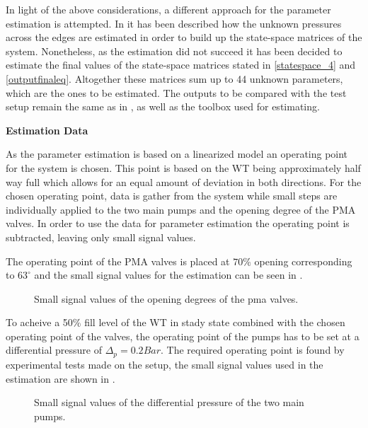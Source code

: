 In light of the above considerations, a different approach for the parameter estimation is attempted. In  it has been described how the 
unknown pressures across the edges are estimated in order to build up the state-space matrices of the system. Nonetheless, as the estimation did not 
succeed it has been decided to estimate the final values of the state-space matrices stated in \eqref{statespace_4} and \eqref{outputfinaleq}. 
Altogether these matrices sum up to 44 unknown parameters, which are the ones to be estimated. The outputs to be compared with the test setup remain 
the same as in , as well as the toolbox used for estimating.

\textbf{Estimation Data}

As the parameter estimation is based on a linearized model an operating point for the system is chosen. This point is based on the WT being approximately half way full which allows for an equal amount of deviation in both directions. For the chosen operating point, data is gather from the system while small steps are individually applied to the two main pumps and the opening degree of the PMA valves. In order to use the data for parameter estimation the operating point is subtracted, leaving only small signal values.  

The operating point of the PMA valves is placed at $70\%$ opening corresponding to $63^{\circ}$ and the small signal values for the estimation can be seen in .

\begin{figure}[H]
\centering
 
\caption{Small signal values of the opening degrees of the pma valves.}
\label{fig:est_OD_data_final}
\end{figure}

To acheive a 50\% fill level of the WT in stady state combined with the chosen operating point of the valves, the operating point of the pumps has to be set at a differential pressure of $\Delta _p = 0.2 Bar$. The required operating point is found by experimental tests made on the setup, the small signal values used in the estimation are shown in . 

\begin{figure}[H]
\centering
 
\caption{Small signal values of the differential pressure of the two main pumps.}
\label{fig:est_deltap_data_final}
\end{figure}



